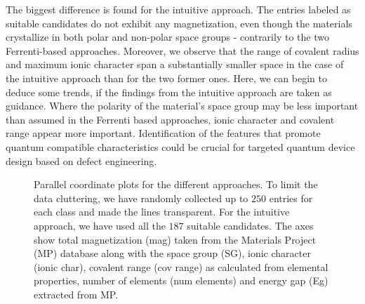 \documentclass[superscriptaddress,unsortedaddress,
 amsmath,amssymb,
 aps,
]{revtex4-2}
\begin{document}
The biggest difference is found for the intuitive approach. The entries labeled as suitable candidates do not exhibit any magnetization, even though the materials crystallize in both polar and non-polar space groups - contrarily to the two Ferrenti-based approaches. Moreover, we observe that the range of covalent radius and maximum ionic character span a substantially smaller space in the case of the intuitive approach than for the two former ones.  
Here, we can begin to deduce some trends, if the findings from the intuitive approach are taken as guidance. Where the polarity of the material's space group may be less important than assumed in the Ferrenti based approaches, ionic character and covalent range appear more important. 
Identification of the features that promote quantum compatible characteristics could be crucial for targeted quantum device design based on defect engineering. 

\begin{figure}[t] %
    \centering
    \begin{subfigure}{1\textwidth}
        \centering
          
    \end{subfigure}
    \begin{subfigure}{1\textwidth}
        \centering
          
    \end{subfigure}
    \begin{subfigure}{1\textwidth}
        \centering
          
    \end{subfigure}
    \caption{Parallel coordinate plots for the different approaches. To limit the data cluttering, we have randomly collected up to $250$ entries for each class and made the lines transparent. For the intuitive approach, we have used all the $187$ suitable candidates. The axes show total magnetization (mag) taken from the Materials Project (MP) database along with the space group (SG), ionic character (ionic char), covalent range (cov range) as calculated from elemental properties, number of elements (num elements) and energy gap (Eg) extracted from MP.} 
    \label{fig:parallel-coordinates-approaches}
\end{figure}
\end{document}
